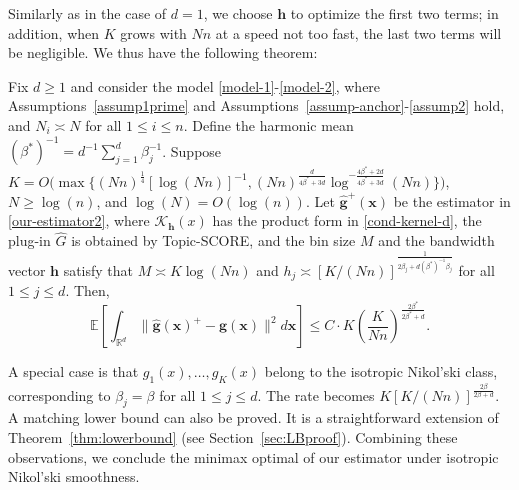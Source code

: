 \documentclass[preprint,11pt]{article}
\newcommand{\mbb}{\mathbb}
\newcommand{\mcal}{\mathcal}
\numberwithin{equation}{section}
\begin{document}
Similarly as in the case of $d=1$, we choose $\bm{h}$ to optimize the first two terms; in addition, when $K$ grows with $Nn$ at a speed not too fast, the last two terms will be negligible. We thus have the following theorem:  
\begin{thm}\label{thm:upperboundind}
Fix $d\geq 1$ and consider the model \eqref{model-1}-\eqref{model-2}, where Assumptions~\ref{assump1prime} and Assumptions~\ref{assump-anchor}-\ref{assump2} hold, and $N_i\asymp N$ for all $1\leq i\leq n$. 
Define the harmonic mean $(\beta^*)^{-1}=d^{-1}\sum_{j=1}^d\beta_j^{-1}$. 
Suppose $
K=O\bigl(\max\bigl\{(Nn)^{\frac{1}{4}}[\log(Nn)]^{-1},(Nn)^{\frac{d}{4\beta^*+3d}}\log^{-\frac{4\beta^*+2d}{4\beta^*+3d}}(Nn)\bigr\}\bigr)$, $N\geq \log(n)$, and $\log(N)=O(\log(n))$. 
Let $\widehat{\boldsymbol g}^+(\bm{x})$ be the estimator in \eqref{our-estimator2}, where $\mcal{K}_{\bm{h}}(x)$ has the product form  in \eqref{cond-kernel-d}, the plug-in $\widehat{G}$ is obtained by Topic-SCORE, 
and the bin size $M$ and the bandwidth vector $\bm{h}$ satisfy that $M\asymp K\log(Nn)$ and $h_j\asymp [K/(Nn)]^{\frac{1}{2\beta_j+d(\beta^*)^{-1}\beta_j}}$ for all $1\le j\le d$. Then, 
\[
\mbb{E}\left[\int_{\mbb{R}^d} \|\widehat{\bm{g}}(\bm{x})^+-\bm{g}(\bm{x})\|^2d\bm{x}\right]\le C \cdot K\left( \frac{K}{Nn} \right)^{\frac{2\beta^*}{2\beta^*+d}}. 
\]
\end{thm}


A special case is that $g_1(x), \ldots, g_K(x)$ belong to the isotropic Nikol'ski class, corresponding to $\beta_j=\beta$ for all $1\leq j\leq d$. The rate becomes $K[K/(Nn)]^{\frac{2\beta}{2\beta+d}}$. 
A matching lower bound can also be proved. It is a straightforward extension of Theorem~\ref{thm:lowerbound} (see Section~\ref{sec:LBproof}). Combining these observations, we conclude the minimax optimal of our estimator under isotropic Nikol'ski smoothness.   

\end{document}
